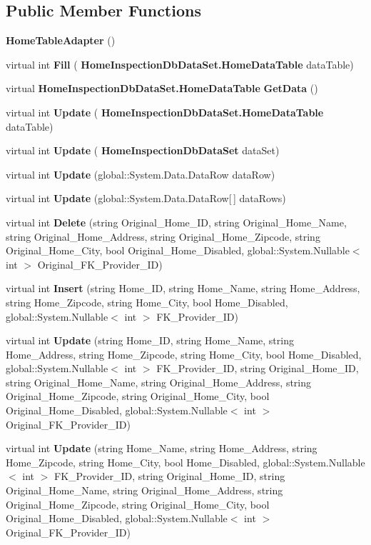 \subsection*{Public Member Functions}
\begin{DoxyCompactItemize}
\item 
\textbf{ Home\+Table\+Adapter} ()
\item 
virtual int \textbf{ Fill} (\textbf{ Home\+Inspection\+Db\+Data\+Set.\+Home\+Data\+Table} data\+Table)
\item 
virtual \textbf{ Home\+Inspection\+Db\+Data\+Set.\+Home\+Data\+Table} \textbf{ Get\+Data} ()
\item 
virtual int \textbf{ Update} (\textbf{ Home\+Inspection\+Db\+Data\+Set.\+Home\+Data\+Table} data\+Table)
\item 
virtual int \textbf{ Update} (\textbf{ Home\+Inspection\+Db\+Data\+Set} data\+Set)
\item 
virtual int \textbf{ Update} (global\+::\+System.\+Data.\+Data\+Row data\+Row)
\item 
virtual int \textbf{ Update} (global\+::\+System.\+Data.\+Data\+Row[$\,$] data\+Rows)
\item 
virtual int \textbf{ Delete} (string Original\+\_\+\+Home\+\_\+\+ID, string Original\+\_\+\+Home\+\_\+\+Name, string Original\+\_\+\+Home\+\_\+\+Address, string Original\+\_\+\+Home\+\_\+\+Zipcode, string Original\+\_\+\+Home\+\_\+\+City, bool Original\+\_\+\+Home\+\_\+\+Disabled, global\+::\+System.\+Nullable$<$ int $>$ Original\+\_\+\+F\+K\+\_\+\+Provider\+\_\+\+ID)
\item 
virtual int \textbf{ Insert} (string Home\+\_\+\+ID, string Home\+\_\+\+Name, string Home\+\_\+\+Address, string Home\+\_\+\+Zipcode, string Home\+\_\+\+City, bool Home\+\_\+\+Disabled, global\+::\+System.\+Nullable$<$ int $>$ F\+K\+\_\+\+Provider\+\_\+\+ID)
\item 
virtual int \textbf{ Update} (string Home\+\_\+\+ID, string Home\+\_\+\+Name, string Home\+\_\+\+Address, string Home\+\_\+\+Zipcode, string Home\+\_\+\+City, bool Home\+\_\+\+Disabled, global\+::\+System.\+Nullable$<$ int $>$ F\+K\+\_\+\+Provider\+\_\+\+ID, string Original\+\_\+\+Home\+\_\+\+ID, string Original\+\_\+\+Home\+\_\+\+Name, string Original\+\_\+\+Home\+\_\+\+Address, string Original\+\_\+\+Home\+\_\+\+Zipcode, string Original\+\_\+\+Home\+\_\+\+City, bool Original\+\_\+\+Home\+\_\+\+Disabled, global\+::\+System.\+Nullable$<$ int $>$ Original\+\_\+\+F\+K\+\_\+\+Provider\+\_\+\+ID)
\item 
virtual int \textbf{ Update} (string Home\+\_\+\+Name, string Home\+\_\+\+Address, string Home\+\_\+\+Zipcode, string Home\+\_\+\+City, bool Home\+\_\+\+Disabled, global\+::\+System.\+Nullable$<$ int $>$ F\+K\+\_\+\+Provider\+\_\+\+ID, string Original\+\_\+\+Home\+\_\+\+ID, string Original\+\_\+\+Home\+\_\+\+Name, string Original\+\_\+\+Home\+\_\+\+Address, string Original\+\_\+\+Home\+\_\+\+Zipcode, string Original\+\_\+\+Home\+\_\+\+City, bool Original\+\_\+\+Home\+\_\+\+Disabled, global\+::\+System.\+Nullable$<$ int $>$ Original\+\_\+\+F\+K\+\_\+\+Provider\+\_\+\+ID)
\end{DoxyCompactItemize}

